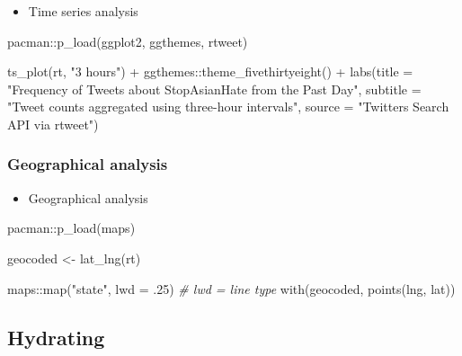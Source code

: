 \documentclass[
]{book}
\newenvironment{Shaded}{\begin{snugshade}}{\end{snugshade}}
\newcommand{\AttributeTok}[1]{\textcolor[rgb]{0.77,0.63,0.00}{#1}}
\newcommand{\CommentTok}[1]{\textcolor[rgb]{0.56,0.35,0.01}{\textit{#1}}}
\newcommand{\DecValTok}[1]{\textcolor[rgb]{0.00,0.00,0.81}{#1}}
\newcommand{\FunctionTok}[1]{\textcolor[rgb]{0.00,0.00,0.00}{#1}}
\newcommand{\NormalTok}[1]{#1}
\newcommand{\OtherTok}[1]{\textcolor[rgb]{0.56,0.35,0.01}{#1}}
\newcommand{\SpecialCharTok}[1]{\textcolor[rgb]{0.00,0.00,0.00}{#1}}
\newcommand{\StringTok}[1]{\textcolor[rgb]{0.31,0.60,0.02}{#1}}
\providecommand{\tightlist}{%
  \setlength{\itemsep}{0pt}\setlength{\parskip}{0pt}}
\begin{document}
\begin{itemize}
\tightlist
\item
  Time series analysis
\end{itemize}

\begin{Shaded}
\begin{Highlighting}[]
\NormalTok{pacman}\SpecialCharTok{::}\FunctionTok{p\_load}\NormalTok{(ggplot2, ggthemes, rtweet)}

\FunctionTok{ts\_plot}\NormalTok{(rt, }\StringTok{"3 hours"}\NormalTok{) }\SpecialCharTok{+}
\NormalTok{  ggthemes}\SpecialCharTok{::}\FunctionTok{theme\_fivethirtyeight}\NormalTok{() }\SpecialCharTok{+}
  \FunctionTok{labs}\NormalTok{(}\AttributeTok{title =} \StringTok{"Frequency of Tweets about StopAsianHate from the Past Day"}\NormalTok{,}
       \AttributeTok{subtitle =} \StringTok{"Tweet counts aggregated using three{-}hour intervals"}\NormalTok{,}
       \AttributeTok{source =} \StringTok{"Twitter\textquotesingle{}s Search API via rtweet"}\NormalTok{)}
\end{Highlighting}
\end{Shaded}

\hypertarget{geographical-analysis}{%
\subsubsection{Geographical analysis}\label{geographical-analysis}}

\begin{itemize}
\tightlist
\item
  Geographical analysis
\end{itemize}

\begin{Shaded}
\begin{Highlighting}[]
\NormalTok{pacman}\SpecialCharTok{::}\FunctionTok{p\_load}\NormalTok{(maps)}

\NormalTok{geocoded }\OtherTok{\textless{}{-}} \FunctionTok{lat\_lng}\NormalTok{(rt)}

\NormalTok{maps}\SpecialCharTok{::}\FunctionTok{map}\NormalTok{(}\StringTok{"state"}\NormalTok{, }\AttributeTok{lwd =}\NormalTok{ .}\DecValTok{25}\NormalTok{) }\CommentTok{\# lwd = line type }
\FunctionTok{with}\NormalTok{(geocoded, }\FunctionTok{points}\NormalTok{(lng, lat))}
\end{Highlighting}
\end{Shaded}

\hypertarget{hydrating}{%
\subsection{Hydrating}\label{hydrating}}
\end{document}
